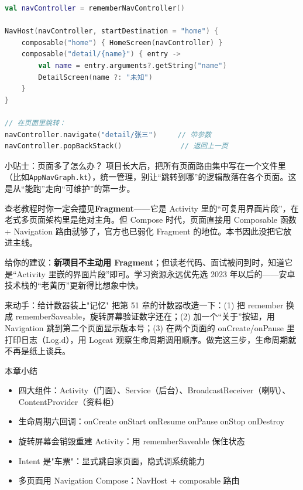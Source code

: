 \begin{lstlisting}[language=Kotlin]
val navController = rememberNavController()

NavHost(navController, startDestination = "home") {
    composable("home") { HomeScreen(navController) }
    composable("detail/{name}") { entry ->
        val name = entry.arguments?.getString("name")
        DetailScreen(name ?: "未知")
    }
}

// 在页面里跳转：
navController.navigate("detail/张三")     // 带参数
navController.popBackStack()              // 返回上一页
\end{lstlisting}

\begin{tcbinfo}{小贴士：页面多了怎么办？}
项目长大后，把所有页面路由集中写在一个文件里（比如\texttt{AppNavGraph.kt}），统一管理，别让“跳转到哪”的逻辑散落在各个页面。这是从“能跑”走向“可维护”的第一步。

\end{tcbinfo}


查老教程时你一定会撞见\textbf{Fragment}——它是 Activity 里的“可复用界面片段”，在老式多页面架构里是绝对主角。但 Compose 时代，页面直接用 Composable 函数 + Navigation 路由就够了，官方也已弱化 Fragment 的地位。本书因此没把它放进主线。

给你的建议：\textbf{新项目不主动用 Fragment}；但读老代码、面试被问到时，知道它是“Activity 里嵌的界面片段”即可。学习资源永远优先选 2023 年以后的——安卓技术栈的“老黄历”更新得比想象中快。

\begin{tcbpractice}{来动手：给计数器装上"记忆"}
把第 51 章的计数器改造一下：(1) 把 remember 换成 rememberSaveable，旋转屏幕验证数字还在；(2) 加一个“关于”按钮，用 Navigation 跳到第二个页面显示版本号；(3) 在两个页面的 onCreate/onPause 里打印日志（Log.d），用 Logcat 观察生命周期调用顺序。做完这三步，生命周期就不再是纸上谈兵。

\end{tcbpractice}

\begin{tcbsummary}{本章小结}
\begin{itemize}
  \item 四大组件：Activity（门面）、Service（后台）、BroadcastReceiver（喇叭）、ContentProvider（资料柜）
  \item 生命周期六回调：onCreate onStart onResume onPause onStop onDestroy
  \item 旋转屏幕会销毁重建 Activity：用 rememberSaveable 保住状态
  \item Intent 是"车票"：显式跳自家页面，隐式调系统能力
  \item 多页面用 Navigation Compose：NavHost + composable 路由
\end{itemize}

\end{tcbsummary}
